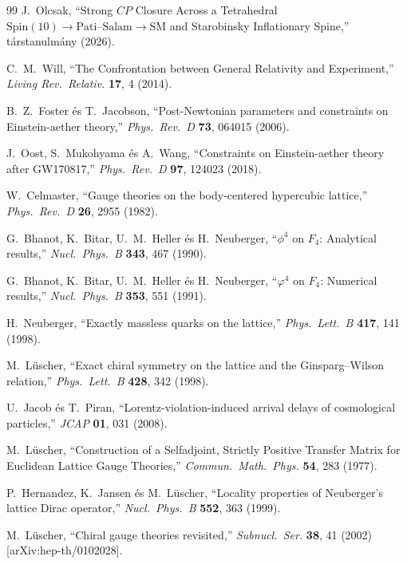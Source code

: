 \documentclass[11pt,a4paper]{article}
\begin{document}
\begin{thebibliography}{99}
J.~Olcsak, ``Strong $CP$ Closure Across a Tetrahedral $\mathrm{Spin}(10) \to \mathrm{Pati\text{--}Salam} \to \mathrm{SM}$ and Starobinsky Inflationary Spine,'' társtanulmány (2026).

C.~M.~Will, ``The Confrontation between General Relativity and Experiment,'' \emph{Living Rev.\ Relativ.} \textbf{17}, 4 (2014).

B.~Z.~Foster és T.~Jacobson, ``Post-Newtonian parameters and constraints on Einstein-aether theory,'' \emph{Phys.\ Rev.\ D} \textbf{73}, 064015 (2006).

J.~Oost, S.~Mukohyama és A.~Wang, ``Constraints on Einstein-aether theory after GW170817,'' \emph{Phys.\ Rev.\ D} \textbf{97}, 124023 (2018).

W.~Celmaster, ``Gauge theories on the body-centered hypercubic lattice,'' \emph{Phys.\ Rev.\ D} \textbf{26}, 2955 (1982).

G.~Bhanot, K.~Bitar, U.~M.~Heller és H.~Neuberger, ``$\phi^4$ on $F_4$: Analytical results,'' \emph{Nucl.\ Phys.\ B} \textbf{343}, 467 (1990).

G.~Bhanot, K.~Bitar, U.~M.~Heller és H.~Neuberger, ``$\varphi^4$ on $F_4$: Numerical results,'' \emph{Nucl.\ Phys.\ B} \textbf{353}, 551 (1991).

H.~Neuberger, ``Exactly massless quarks on the lattice,'' \emph{Phys.\ Lett.\ B} \textbf{417}, 141 (1998).

M.~L\"uscher, ``Exact chiral symmetry on the lattice and the Ginsparg--Wilson relation,'' \emph{Phys.\ Lett.\ B} \textbf{428}, 342 (1998).

U.~Jacob és T.~Piran, ``Lorentz-violation-induced arrival delays of cosmological particles,'' \emph{JCAP} \textbf{01}, 031 (2008).

M.~L\"uscher, ``Construction of a Selfadjoint, Strictly Positive Transfer Matrix for Euclidean Lattice Gauge Theories,'' \emph{Commun.\ Math.\ Phys.} \textbf{54}, 283 (1977).

P.~Hernandez, K.~Jansen és M.~L\"uscher, ``Locality properties of Neuberger's lattice Dirac operator,'' \emph{Nucl.\ Phys.\ B} \textbf{552}, 363 (1999).

M.~L\"uscher, ``Chiral gauge theories revisited,'' \emph{Subnucl.\ Ser.} \textbf{38}, 41 (2002) [arXiv:hep-th/0102028].


\end{thebibliography}
\end{document}
